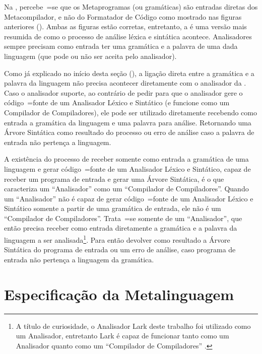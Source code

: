 Na ,
percebe~=se que os Metaprogramas (ou gramáticas) são entradas diretas dos Metacompilador,
e não do Formatador de Código como mostrado nas figuras anteriores ().
Ambas as figuras estão corretas,
entretanto,
a  é uma versão mais resumida de como o processo de análise léxica e
sintática acontece.
Analisadores sempre precisam como entrada ter uma gramática e
a palavra de uma dada linguagem (que pode ou
não ser aceita pelo analisador).

Como já explicado no início desta seção (),
a ligação direta entre a gramática e
a palavra da linguagem não precisa acontecer diretamente com o analisador da .
Caso o analisador suporte,
ao contrário de pedir para que o analisador gere o código~=fonte de um Analisador Léxico e
Sintático (e funcione como um Compilador de Compiladores),
ele pode ser utilizado diretamente recebendo como entrada a gramática da linguagem e
uma palavra para análise.
Retornando uma Árvore Sintática como resultado do processo ou
erro de análise caso a palavra de entrada não pertença a linguagem.

A existência do processo de receber somente como entrada a gramática de uma linguagem e
gerar código~=fonte de um Analisador Léxico e
Sintático,
capaz de receber um programa de entrada e
gerar uma Árvore Sintática,
é o que caracteriza um ``Analisador'' como um ``Compilador de Compiladores''.
Quando um ``Analisador'' não é capaz de gerar código~=fonte de um Analisador Léxico e
Sintático somente a partir de uma gramática de entrada,
ele não é um ``Compilador de Compiladores''.
Trata~=se somente de um ``Analisador'',
que então precisa receber como entrada diretamente a gramática e
a palavra da linguagem a ser analisada\footnote{
A título de curiosidade,
o Analisador Lark deste trabalho foi utilizado como um Analisador,
entretanto Lark é capaz de funcionar tanto como um Analisador quanto como um ``Compilador de Compiladores'' \cite{antlrBookTerrentParr}.
}.
Para então devolver como resultado a Árvore Sintática do programa de entrada ou
um erro de análise,
caso programa de entrada não pertença a linguagem da gramática.


\section{Especificação da Metalinguagem}
\label{section:metalinguagemGrammar}

